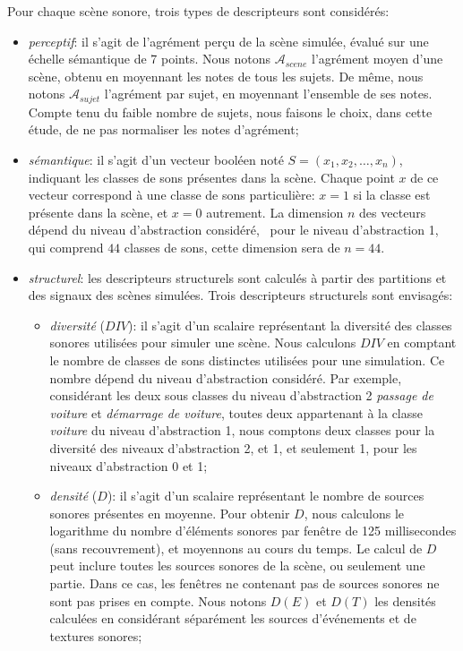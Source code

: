 Pour chaque scène sonore, trois types de descripteurs sont considérés:

\begin{itemize}
\item \emph{perceptif}: il s'agit de l'agrément perçu de la scène simulée, évalué sur une échelle sémantique de 7 points. Nous notons $\mathcal{A}_{scene}$ l'agrément moyen d'une scène, obtenu en moyennant les notes de tous les sujets. De même, nous notons  $\mathcal{A}_{sujet}$ l'agrément par sujet, en moyennant l'ensemble de ses notes. Compte tenu du faible nombre de sujets, nous faisons le choix, dans cette étude, de ne pas normaliser les notes d'agrément;
\item \emph{sémantique}: il s'agit d'un vecteur booléen noté $S=(x_1,x_2,\ldots,x_n)$, indiquant les classes de sons présentes dans la scène. Chaque point $x$ de ce vecteur correspond à une classe de sons particulière: $x=1$ si la classe est présente dans la scène, et $x=0$ autrement. La dimension $n$ des vecteurs dépend du niveau d'abstraction considéré, \eg~pour le niveau d'abstraction 1, qui comprend $44$ classes de sons, cette dimension sera de $n=44$.
\item \emph{structurel}: les descripteurs structurels sont calculés à partir des partitions et des signaux des scènes simulées. Trois descripteurs structurels sont envisagés:
\begin{itemize}
\item \emph{diversité} ($DIV$): il s'agit d'un scalaire représentant la diversité des classes sonores utilisées pour simuler une scène. Nous calculons $DIV$ en comptant le nombre de classes de sons distinctes utilisées pour une simulation. Ce nombre dépend du niveau d'abstraction considéré. Par exemple, considérant les deux sous classes du niveau d'abstraction 2 \emph{passage de voiture} et \emph{démarrage de voiture}, toutes deux appartenant à la classe \emph{voiture} du niveau d'abstraction 1, nous comptons deux classes pour la diversité des niveaux d'abstraction 2, et 1, et seulement 1, pour les niveaux d'abstraction 0 et 1;
\item \emph{densité} ($D$): il s'agit d'un scalaire représentant le nombre de sources sonores présentes en moyenne. Pour obtenir $D$, nous calculons le logarithme du nombre d'éléments sonores par fenêtre de 125 millisecondes (sans recouvrement), et moyennons au cours du temps. Le calcul de $D$ peut inclure toutes les sources sonores de la scène, ou seulement une partie. Dans ce cas, les fenêtres ne contenant pas de sources sonores ne sont pas prises en compte. Nous notons $D(E)$ et $D(T)$ les densités calculées en considérant séparément les sources d'événements et de textures sonores;

\end{itemize}
\end{itemize}
